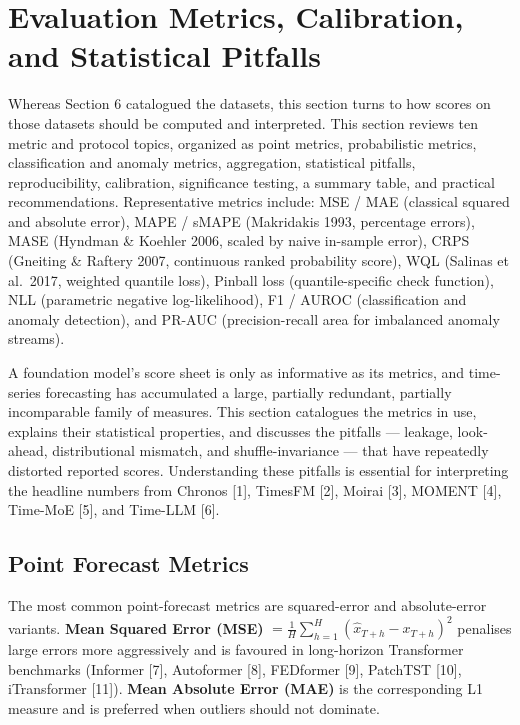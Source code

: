 \documentclass{article}
\begin{document}
\section{Evaluation Metrics, Calibration, and Statistical Pitfalls}\label{evaluation-metrics-calibration-and-statistical-pitfalls}

Whereas Section 6 catalogued the datasets, this section turns to how scores on those datasets should be computed and interpreted. This section reviews ten metric and protocol topics, organized as point metrics, probabilistic metrics, classification and anomaly metrics, aggregation, statistical pitfalls, reproducibility, calibration, significance testing, a summary table, and practical recommendations. Representative metrics include: MSE / MAE (classical squared and absolute error), MAPE / sMAPE (Makridakis 1993, percentage errors), MASE (Hyndman \& Koehler 2006, scaled by naive in-sample error), CRPS (Gneiting \& Raftery 2007, continuous ranked probability score), WQL (Salinas et al.~2017, weighted quantile loss), Pinball loss (quantile-specific check function), NLL (parametric negative log-likelihood), F1 / AUROC (classification and anomaly detection), and PR-AUC (precision-recall area for imbalanced anomaly streams).

A foundation model's score sheet is only as informative as its metrics, and time-series forecasting has accumulated a large, partially redundant, partially incomparable family of measures. This section catalogues the metrics in use, explains their statistical properties, and discusses the pitfalls --- leakage, look-ahead, distributional mismatch, and shuffle-invariance --- that have repeatedly distorted reported scores. Understanding these pitfalls is essential for interpreting the headline numbers from Chronos {[}1{]}, TimesFM {[}2{]}, Moirai {[}3{]}, MOMENT {[}4{]}, Time-MoE {[}5{]}, and Time-LLM {[}6{]}.

\subsection{Point Forecast Metrics}\label{point-forecast-metrics}

The most common point-forecast metrics are squared-error and absolute-error variants. \textbf{Mean Squared Error (MSE)} \(= \frac{1}{H} \sum_{h=1}^H (\hat{x}_{T+h} - x_{T+h})^2\) penalises large errors more aggressively and is favoured in long-horizon Transformer benchmarks (Informer {[}7{]}, Autoformer {[}8{]}, FEDformer {[}9{]}, PatchTST {[}10{]}, iTransformer {[}11{]}). \textbf{Mean Absolute Error (MAE)} is the corresponding L1 measure and is preferred when outliers should not dominate.
\end{document}
